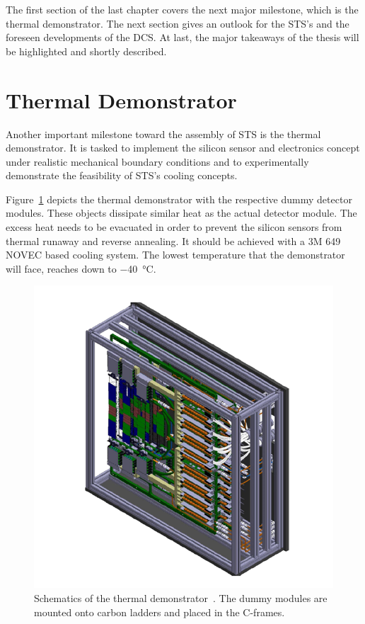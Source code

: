 The first section of the last chapter covers the next major milestone, which is the thermal demonstrator. The next section gives an outlook for the \gls{STS}'s and the foreseen developments of the \gls{DCS}. At last, the major takeaways of the thesis will be highlighted and shortly described.

\section{Thermal Demonstrator}
Another important milestone toward the assembly of \gls{STS} is the thermal demonstrator. It is tasked to implement the silicon sensor and electronics concept under realistic mechanical boundary conditions and to experimentally demonstrate the feasibility of \gls{STS}’s cooling concepts. 

Figure~\ref{fig:demo} depicts the thermal demonstrator with the respective dummy detector modules. These objects dissipate similar heat as the actual detector module. The excess heat needs to be evacuated in order to prevent the silicon sensors from thermal runaway and reverse annealing. It should be achieved with a 3M 649 NOVEC based cooling system. The lowest temperature that the demonstrator will face, reaches down to \SI{-40}{\celsius}. 

\begin{figure}[!h]
    \centering
    \includegraphics[width=0.65\columnwidth]{Chapter7/images/thermal_demo.png}
    \caption{Schematics of the thermal demonstrator~\cite{thermal_demo}. The dummy modules are mounted onto carbon ladders and placed in the C-frames.}
    \label{fig:demo}
\end{figure}
\label{demo}

